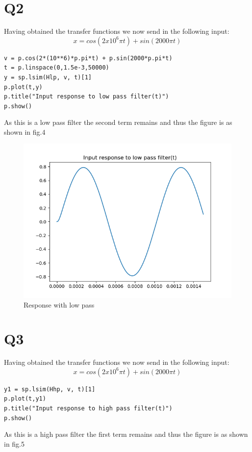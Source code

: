 \documentclass[12pt, a4paper]{report}
\begin{document}
\section*{Q2}
Having obtained the transfer functions we now send in the following input:
 \begin{equation}
x = cos(2x10^{6}\pi t) + sin(2000\pi t)
 \end{equation}
\begin{verbatim}
v = p.cos(2*(10**6)*p.pi*t) + p.sin(2000*p.pi*t)
t = p.linspace(0,1.5e-3,50000)
y = sp.lsim(Hlp, v, t)[1]   
p.plot(t,y)
p.title("Input response to low pass filter(t)")
p.show()
\end{verbatim}
As this is a low pass filter the second term remains and thus the figure is as shown in fig.4
  \begin{figure}
	\centering
	\includegraphics[scale=0.8]{figure_4..png}  %
	\caption{Response with low pass}
	\label{fig:4}
\end{figure}

\section*{Q3}
Having obtained the transfer functions we now send in the following input:
 \begin{equation}
x = cos(2x10^{6}\pi t) + sin(2000\pi t)
 \end{equation}

\begin{verbatim}
y1 = sp.lsim(Hhp, v, t)[1]   
p.plot(t,y1)
p.title("Input response to high pass filter(t)")
p.show()
\end{verbatim}
As this is a high pass filter the first term remains and thus the figure is as shown in fig.5
\end{document}
